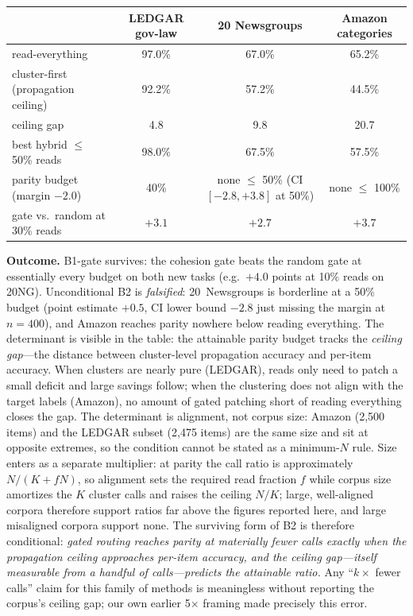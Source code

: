 \documentclass[11pt]{article}
\begin{document}
\begin{center}
\begin{tabular}{lccc}
\toprule
 & LEDGAR gov-law & 20 Newsgroups & Amazon categories \\
\midrule
read-everything & 97.0\% & 67.0\% & 65.2\% \\
cluster-first (propagation ceiling) & 92.2\% & 57.2\% & 44.5\% \\
ceiling gap & 4.8 & 9.8 & 20.7 \\
best hybrid $\leq$ 50\% reads & 98.0\% & 67.5\% & 57.5\% \\
parity budget (margin $-2.0$) & 40\% & none $\leq$ 50\% (CI $[-2.8,+3.8]$ at 50\%) & none $\leq$ 100\% \\
gate vs.\ random at 30\% reads & $+3.1$ & $+2.7$ & $+3.7$ \\
\bottomrule
\end{tabular}
\end{center}

\textbf{Outcome.} B1-gate survives: the cohesion gate beats the random gate at essentially every budget on both new tasks (e.g.\ $+4.0$ points at 10\% reads on 20NG). Unconditional B2 is \emph{falsified}: 20~Newsgroups is borderline at a 50\% budget (point estimate $+0.5$, CI lower bound $-2.8$ just missing the margin at $n{=}400$), and Amazon reaches parity nowhere below reading everything. The determinant is visible in the table: the attainable parity budget tracks the \emph{ceiling gap}---the distance between cluster-level propagation accuracy and per-item accuracy. When clusters are nearly pure (LEDGAR), reads only need to patch a small deficit and large savings follow; when the clustering does not align with the target labels (Amazon), no amount of gated patching short of reading everything closes the gap. The determinant is alignment, not corpus size: Amazon (2{,}500 items) and the LEDGAR subset (2{,}475 items) are the same size and sit at opposite extremes, so the condition cannot be stated as a minimum-$N$ rule. Size enters as a separate multiplier: at parity the call ratio is approximately $N/(K + fN)$, so alignment sets the required read fraction $f$ while corpus size amortizes the $K$ cluster calls and raises the ceiling $N/K$; large, well-aligned corpora therefore support ratios far above the figures reported here, and large misaligned corpora support none. The surviving form of B2 is therefore conditional: \emph{gated routing reaches parity at materially fewer calls exactly when the propagation ceiling approaches per-item accuracy, and the ceiling gap---itself measurable from a handful of calls---predicts the attainable ratio.} Any ``$k\times$ fewer calls'' claim for this family of methods is meaningless without reporting the corpus's ceiling gap; our own earlier 5$\times$ framing made precisely this error.
\end{document}
